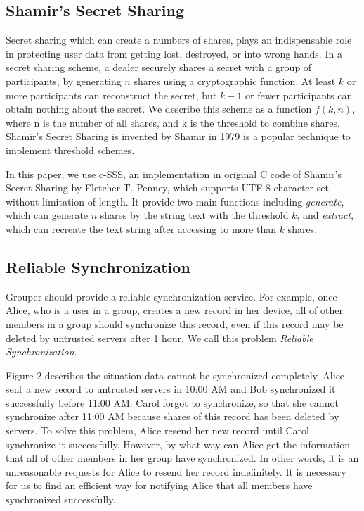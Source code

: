 \documentclass[twocolumn,10pt]{article}
\begin{document}
\subsection{Shamir's Secret Sharing}
Secret sharing which can create a numbers of shares, plays an indispensable role in protecting user data from getting lost, destroyed, or into wrong hands. In a secret sharing scheme, a dealer securely shares a secret with a group of participants, by generating $n$ shares using a cryptographic function\cite{smith2013layered}. At least $k$ or more participants can reconstruct the secret, but $k-1$ or fewer participants can obtain nothing about the secret\cite{pang2005new}. We describe this scheme as a function $f(k, n)$, where n is the number of all shares, and k is the threshold to combine shares.  Shamir's Secret Sharing is invented by Shamir in 1979 is a popular technique to implement threshold schemes.

In this paper, we use c-SSS\cite{c-sss}, an implementation in original C code of Shamir's Secret Sharing by Fletcher T. Penney, which supports UTF-8 character set without limitation of length. It provide two main functions including \emph{generate}, which can generate $n$ shares by the string text with the threshold $k$, and \emph{extract}, which can recreate the text string after accessing to more than $k$ shares.

\subsection{Reliable Synchronization}
Grouper should provide a reliable synchronization service. For example, once Alice, who is a user in a group, creates a new record in her device, all of other members in a group should synchronize this record, even if this record may be deleted by untrusted servers after 1 hour. We call this problem \emph{Reliable Synchronization}.

Figure 2 describes the situation data cannot be synchronized completely. Alice sent a new record to untrusted servers in 10:00 AM and Bob synchronized it successfully before 11:00 AM. Carol forgot to synchronize, so that she cannot synchronize after 11:00 AM because shares of this record has been deleted by servers. To solve this problem, Alice resend her new record until Carol synchronize it successfully. However, by what way can Alice get the information that all of other members in her group have synchronized. In other words, it is an unreasonable requests for Alice to resend her record indefinitely. It is necessary for us to find an efficient way for notifying Alice that all members have synchronized successfully.
\end{document}
